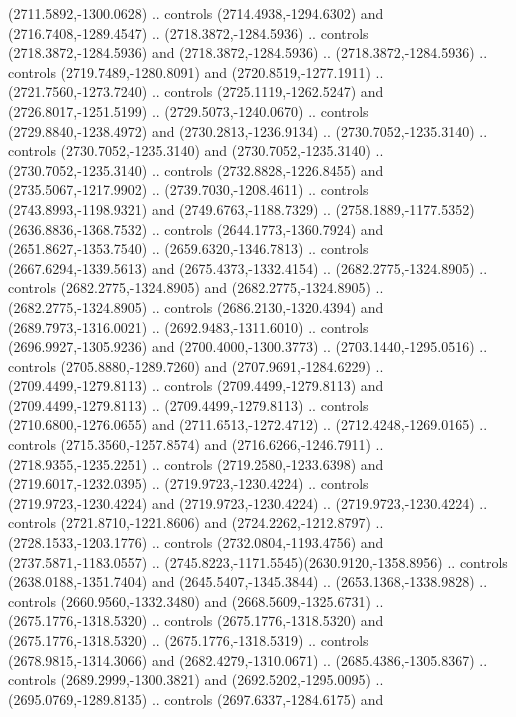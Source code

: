 \begin{scope}[shift={(28.3138,-376.6591)}]
\begin{scope}[shift={(-2186.6262,1813.8454)}]
      (2711.5892,-1300.0628) .. controls (2714.4938,-1294.6302) and
      (2716.7408,-1289.4547) .. (2718.3872,-1284.5936) .. controls
      (2718.3872,-1284.5936) and (2718.3872,-1284.5936) .. (2718.3872,-1284.5936) ..
      controls (2719.7489,-1280.8091) and (2720.8519,-1277.1911) ..
      (2721.7560,-1273.7240) .. controls (2725.1119,-1262.5247) and
      (2726.8017,-1251.5199) .. (2729.5073,-1240.0670) .. controls
      (2729.8840,-1238.4972) and (2730.2813,-1236.9134) .. (2730.7052,-1235.3140) ..
      controls (2730.7052,-1235.3140) and (2730.7052,-1235.3140) ..
      (2730.7052,-1235.3140) .. controls (2732.8828,-1226.8455) and
      (2735.5067,-1217.9902) .. (2739.7030,-1208.4611) .. controls
      (2743.8993,-1198.9321) and (2749.6763,-1188.7329) ..
      (2758.1889,-1177.5352)(2636.8836,-1368.7532) .. controls
      (2644.1773,-1360.7924) and (2651.8627,-1353.7540) .. (2659.6320,-1346.7813) ..
      controls (2667.6294,-1339.5613) and (2675.4373,-1332.4154) ..
      (2682.2775,-1324.8905) .. controls (2682.2775,-1324.8905) and
      (2682.2775,-1324.8905) .. (2682.2775,-1324.8905) .. controls
      (2686.2130,-1320.4394) and (2689.7973,-1316.0021) .. (2692.9483,-1311.6010) ..
      controls (2696.9927,-1305.9236) and (2700.4000,-1300.3773) ..
      (2703.1440,-1295.0516) .. controls (2705.8880,-1289.7260) and
      (2707.9691,-1284.6229) .. (2709.4499,-1279.8113) .. controls
      (2709.4499,-1279.8113) and (2709.4499,-1279.8113) .. (2709.4499,-1279.8113) ..
      controls (2710.6800,-1276.0655) and (2711.6513,-1272.4712) ..
      (2712.4248,-1269.0165) .. controls (2715.3560,-1257.8574) and
      (2716.6266,-1246.7911) .. (2718.9355,-1235.2251) .. controls
      (2719.2580,-1233.6398) and (2719.6017,-1232.0395) .. (2719.9723,-1230.4224) ..
      controls (2719.9723,-1230.4224) and (2719.9723,-1230.4224) ..
      (2719.9723,-1230.4224) .. controls (2721.8710,-1221.8606) and
      (2724.2262,-1212.8797) .. (2728.1533,-1203.1776) .. controls
      (2732.0804,-1193.4756) and (2737.5871,-1183.0557) ..
      (2745.8223,-1171.5545)(2630.9120,-1358.8956) .. controls
      (2638.0188,-1351.7404) and (2645.5407,-1345.3844) .. (2653.1368,-1338.9828) ..
      controls (2660.9560,-1332.3480) and (2668.5609,-1325.6731) ..
      (2675.1776,-1318.5320) .. controls (2675.1776,-1318.5320) and
      (2675.1776,-1318.5320) .. (2675.1776,-1318.5319) .. controls
      (2678.9815,-1314.3066) and (2682.4279,-1310.0671) .. (2685.4386,-1305.8367) ..
      controls (2689.2999,-1300.3821) and (2692.5202,-1295.0095) ..
      (2695.0769,-1289.8135) .. controls (2697.6337,-1284.6175) and

\end{scope}
\end{scope}
